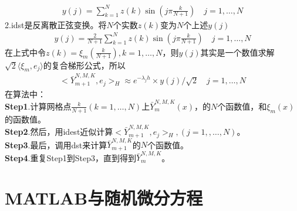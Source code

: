             \begin{align*}
            y(j) = \sum_{k = 1}^N z(k)\sin\left(j\pi \frac{k}{N+1}\right)\quad j = 1,\dots,N
            \end{align*}
            2.idst是反离散正弦变换。将$N$个实数$z(k)$变为$N$个上述$y(j)$
            \begin{align*}
                y(j) = \frac{2}{N+1} \sum_{k=1}^Nz(k) \sin \left(j\pi \frac{k}{N+1}\right)\quad j = 1,\dots,N
            \end{align*}
            在上式中令$z(k) = \xi_m\left(\frac{k}{N+1}\right),k = 1,\dots,N$，则$y(j)$其实是一个数值求解$\sqrt{2}\langle \xi_m,e_j\rangle$的复合梯形公式，所以
            \begin{align*}
                \bigl< \bar{Y}_{m+1}^{N,M,K} ,e_j\bigr>_H \approx e^{-\lambda_j h}\times y(j)/\sqrt{2} \quad j = 1,\dots,N
            \end{align*}
            在算法中：\\
            \textbf{Step1}.计算网格点$\frac{k}{N+1} (k = 1,\dots,N) $上$\bar{Y}_{m}^{N,M,K}(x)$，的$N$个函数值，和$\xi_m(x)$的函数值。\\
            \textbf{Step2}.然后，用idest近似计算$\bigl< \bar{Y}_{m+1}^{N,M,K} ,e_j\bigr>_H,(j = 1,,\dots,N)$。\\
            \textbf{Step3}.最后，调用dst来计算$\bar{Y}_{m+1}^{N,M,K}$的$N$个函数值。\\
            \textbf{Step4}.重复Step1到Step3，直到得到$\bar{Y}_{m}^{N,M,K}$。
\section{MATLAB与随机微分方程}
